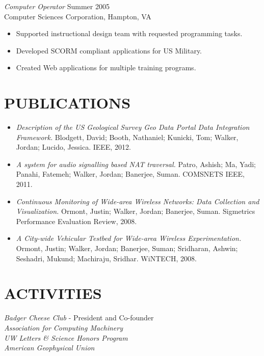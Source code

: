 \documentclass[line,margin]{res}
\begin{document}
\begin{resume}
\begin{itemize}
                \end{itemize}
                	{\sl Computer Operator} \hfill Summer 2005 \\
                Computer Sciences Corporation, Hampton, VA
                \begin{itemize} \itemsep -2pt 
		\item Supported instructional design team with requested programming tasks.
		\item Developed SCORM compliant applications for US Military.
		\item Created Web applications for multiple training programs.
                \end{itemize}

\section{PUBLICATIONS}
	\begin{itemize} \itemsep -2pt
		\item {\sl Description of the US Geological Survey Geo Data Portal Data Integration Framework.}  Blodgett, David; Booth, Nathaniel; Kunicki, Tom; Walker, Jordan; Lucido, Jessica. IEEE, 2012.
		\item {\sl A system for audio signalling based NAT traversal.} Patro, Ashish; Ma, Yadi; Panahi, Fatemeh; Walker, Jordan; Banerjee, Suman. COMSNETS IEEE, 2011.
     		\item {\sl Continuous Monitoring of Wide-area Wireless Networks: Data Collection and Visualization.} Ormont, Justin; Walker, Jordan; Banerjee, Suman. Sigmetrics Performance Evaluation Review, 2008.
		\item {\sl A City-wide Vehicular Testbed for Wide-area Wireless Experimentation.} Ormont, Justin; Walker, Jordan; Banerjee, Suman; Sridharan, Ashwin; Seshadri, Mukund; Machiraju, Sridhar. WiNTECH, 2008.
	\end{itemize}

\section{ACTIVITIES}             
	{\sl Badger Cheese Club} - President and Co-founder\\
	{\sl Association for Computing Machinery} \\
	{\sl UW Letters \& Science Honors Program} \\
	{\sl American Geophysical Union} \\

\end{resume}
\end{document}
